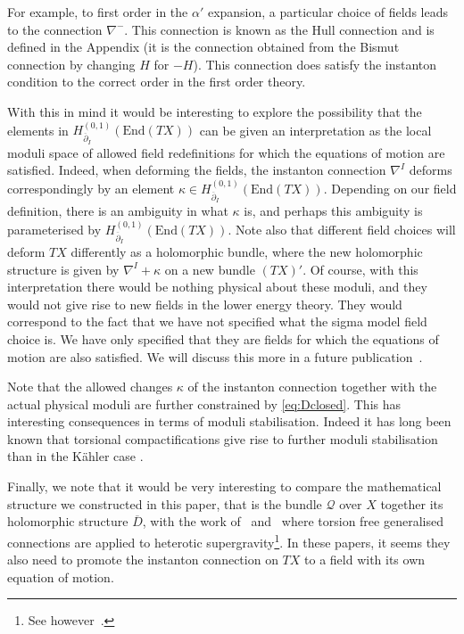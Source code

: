 \documentclass[12pt,a4paper]{article}
\def\bar#1{\overline{#1}}
\def\End{\textrm{End}}
\def\bp{\bar{\partial}}
\def\Q{\mathcal{Q}}
\theoremstyle{definition}
\begin{document}
For example, to first order in the $\alpha'$ expansion, a particular choice of fields leads to the connection $\nabla^-$. This connection is known as the Hull connection and is defined in the Appendix (it is the connection obtained from the Bismut connection by changing $H$ for $-H$). This connection does satisfy the instanton condition to the correct order in the first order theory. 

With this in mind it would be interesting to explore the possibility that the elements in $H^{(0,1)}_{\bp_I}(\End(TX))$ can be given an interpretation as the local moduli space of allowed field redefinitions for which the equations of motion are satisfied.
Indeed, when deforming the fields, the instanton connection $\nabla^I$ deforms correspondingly by an element $\kappa\in H^{(0,1)}_{\bp_I}(\End(TX))$. Depending on our field definition, there is an ambiguity in what $\kappa$ is, and perhaps this ambiguity is parameterised by $H^{(0,1)}_{\bp_I}(\End(TX))$. Note also that different field choices will deform $TX$ differently as a holomorphic bundle, where the new holomorphic structure is given by $\nabla^I+\kappa$ on a new bundle $(TX)'$. 
Of course, with this interpretation there would be nothing physical about these moduli, and they would not give rise to new fields in the lower energy theory. They would correspond to the fact that we have not specified what the sigma model field choice is. We have only specified that they are fields for which the equations of motion are also satisfied. We will discuss this more in a future publication~\citep{delaossa2014}.

Note that the allowed changes $\kappa$ of the instanton connection together with the actual physical moduli are further constrained by \eqref{eq:Dclosed}. This has interesting consequences in terms of moduli stabilisation. Indeed it has long been known that torsional compactifications give rise to further moduli stabilisation than in the K\"ahler case \cite{Dasgupta:1999ss, LopesCardoso:2003af, Becker:2006xp, Klaput:2012vv, Cicoli:2013rwa}. 

Finally, we note that it would be very interesting to compare the mathematical structure we constructed in this paper, that is the bundle $\Q$ over $X$ together its  holomorphic structure $\bar D$, with the work of~\citep{2013arXiv1304.4294G} and~\citep{2013arXiv1308.5159B} where torsion free generalised connections are applied to heterotic supergravity\footnote{See however~\citep{Anderson:2014xha}.}. In these papers, it seems they also need to promote the instanton connection on $TX$ to a field with its own equation of motion. 
\end{document}
